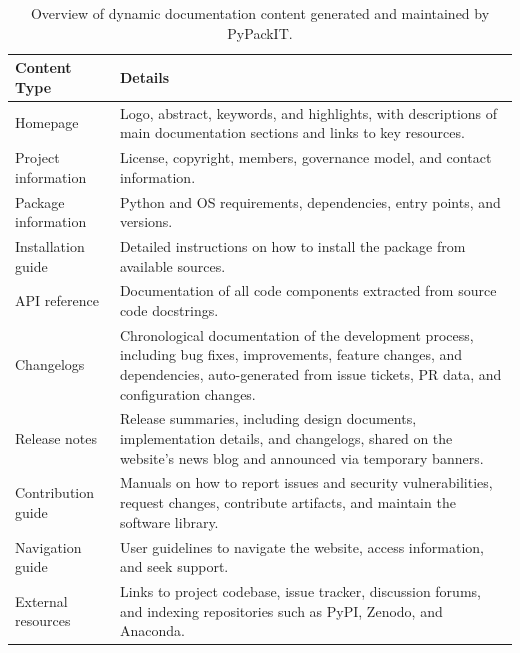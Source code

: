 \documentclass{article}
\begin{document}
\begin{table}[h!]
\centering
\caption{Overview of dynamic documentation content generated and maintained by PyPackIT.}
\label{table:template-documentation-materials}
\begin{tabularx}{\textwidth}{p{} X}
\toprule
\rowcolor{white} \textbf{Content Type} & \textbf{Details}\\
\midrule

Homepage & Logo, abstract, keywords, and highlights, with descriptions of main documentation sections and links to key resources.\\

Project information & License, copyright, members, governance model, and contact information.\\

Package information & Python and OS requirements, dependencies, entry points, and versions.\\

Installation guide & Detailed instructions on how to install the package from available sources.\\

API reference & Documentation of all code components extracted from source code docstrings.\\

Changelogs & Chronological documentation of the development process, including bug fixes, improvements, feature changes, and dependencies, auto-generated from issue tickets, PR data, and configuration changes.\\

Release notes & Release summaries, including design documents, implementation details, and changelogs, shared on the website's news blog and announced via temporary banners.\\

Contribution guide & Manuals on how to report issues and security vulnerabilities, request changes, contribute artifacts, and maintain the software library. \\

Navigation guide & User guidelines to navigate the website, access information, and seek support.\\

External resources & Links to project codebase, issue tracker, discussion forums, and indexing repositories such as PyPI, Zenodo, and Anaconda.\\
\bottomrule
\end{tabularx}
\end{table}
\end{document}
